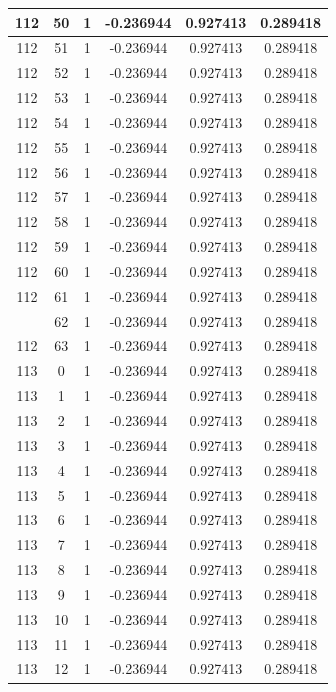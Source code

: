 \documentclass[12pt,a4paper]{article}
\numberwithin{equation}{section}
\numberwithin{figure}{section}
\numberwithin{table}{section}
\begin{document}
\begin{longtable}{|c|c|c|c|c|c|}
112 & 50 & 1 & -0.236944 & 0.927413 & 0.289418 \\ \hline
112 & 51 & 1 & -0.236944 & 0.927413 & 0.289418 \\ \hline
112 & 52 & 1 & -0.236944 & 0.927413 & 0.289418 \\ \hline
112 & 53 & 1 & -0.236944 & 0.927413 & 0.289418 \\ \hline
112 & 54 & 1 & -0.236944 & 0.927413 & 0.289418 \\ \hline
112 & 55 & 1 & -0.236944 & 0.927413 & 0.289418 \\ \hline
112 & 56 & 1 & -0.236944 & 0.927413 & 0.289418 \\ \hline
112 & 57 & 1 & -0.236944 & 0.927413 & 0.289418 \\ \hline
112 & 58 & 1 & -0.236944 & 0.927413 & 0.289418 \\ \hline
112 & 59 & 1 & -0.236944 & 0.927413 & 0.289418 \\ \hline
112 & 60 & 1 & -0.236944 & 0.927413 & 0.289418 \\ \hline
112 & 61 & 1 & -0.236944 & 0.927413 & 0.289418 \\ \hline
\pagebreak
112 & 62 & 1 & -0.236944 & 0.927413 & 0.289418 \\ \hline
112 & 63 & 1 & -0.236944 & 0.927413 & 0.289418 \\ \hline
113 & 0 & 1 & -0.236944 & 0.927413 & 0.289418 \\ \hline
113 & 1 & 1 & -0.236944 & 0.927413 & 0.289418 \\ \hline
113 & 2 & 1 & -0.236944 & 0.927413 & 0.289418 \\ \hline
113 & 3 & 1 & -0.236944 & 0.927413 & 0.289418 \\ \hline
113 & 4 & 1 & -0.236944 & 0.927413 & 0.289418 \\ \hline
113 & 5 & 1 & -0.236944 & 0.927413 & 0.289418 \\ \hline
113 & 6 & 1 & -0.236944 & 0.927413 & 0.289418 \\ \hline
113 & 7 & 1 & -0.236944 & 0.927413 & 0.289418 \\ \hline
113 & 8 & 1 & -0.236944 & 0.927413 & 0.289418 \\ \hline
113 & 9 & 1 & -0.236944 & 0.927413 & 0.289418 \\ \hline
113 & 10 & 1 & -0.236944 & 0.927413 & 0.289418 \\ \hline
113 & 11 & 1 & -0.236944 & 0.927413 & 0.289418 \\ \hline
113 & 12 & 1 & -0.236944 & 0.927413 & 0.289418 \\ \hline

\end{longtable}
\end{document}
